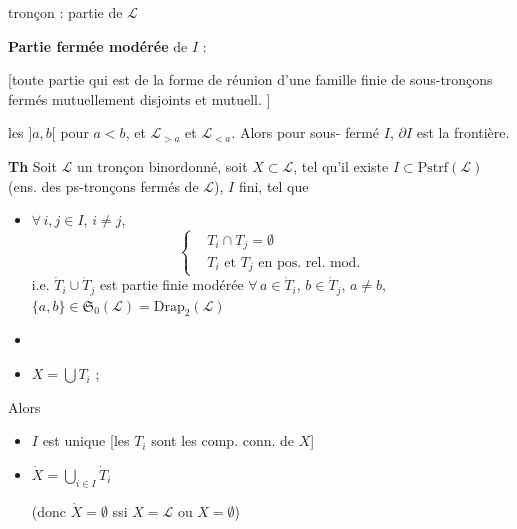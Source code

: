 \documentclass[11pt,a4paper]{article}
\begin{document}
\ill{} tronçon  : \ill{} partie de $\mathcal{L}$ \ill{}

\textbf{Partie fermée modérée} de $I$ :

[toute partie qui est de la forme de réunion d'une famille finie de sous-tronçons fermés mutuellement disjoints et mutuell. \ill{} ]

 \ill{} \ill{}  les $]a, b[$ pour $a < b$, et  $\mathcal{L}_{>a}$ et $\mathcal{L}_{<a}$. Alors \struck{\ill{}} pour  sous- fermé $I$, $\partial I$ est la frontière.

\textbf{Th} Soit $\mathcal{L}$ un tronçon binordonné, soit $X \subset \mathcal{L}$, tel qu'il existe $I \subset \mathrm{Pstrf}(\mathcal{L})$ (ens. des ps-tronçons fermés de $\mathcal{L}$), $I$ fini, \struck{\ill{}} tel que
\begin{itemize}
  \item[a)] $\forall\, i, j \in I$, $i \neq j$,
  \[
    \left\{
    \begin{aligned}
      &T_i \cap T_j = \emptyset \\
      &T_i \text{ et } T_j \text{ en pos. rel. mod.}
    \end{aligned}
    \right.
  \]
  i.e. \struck{\ill{}} $\dot{T}_i \cup \dot{T}_j$ est partie finie modérée  $\forall\, a \in \dot{T}_i$, $b \in \dot{T}_j$, $a \neq b$, \ill{} $\{a,b\} \in \mathfrak{S}_0(\mathcal{L}) = \mathrm{Drap}_2(\mathcal{L})$
  \item[] \struck{\ill{}}
  \item[b)] $X = \bigcup T_i$ ;
\end{itemize}

Alors
\begin{itemize}
  \item[1°)] $I$ est unique [les $T_i$ sont les comp. conn. de $X$]
  \item[2°)] \struck{\ill{}} $\dot{X} = \bigcup_{i \in I} \dot{T}_i$

  (donc $\dot{X} = \emptyset$ ssi \struck{\ill{}} $X = \mathcal{L}$ ou $X = \emptyset$)
\end{itemize}
\end{document}

